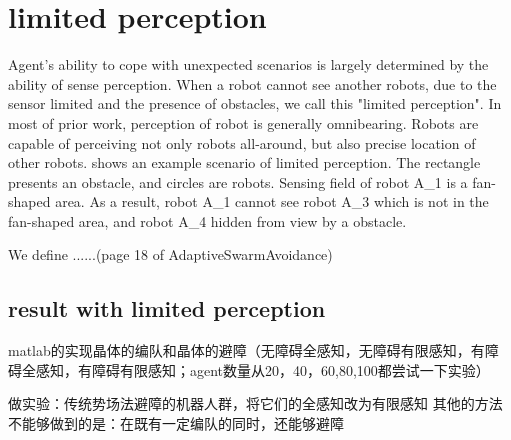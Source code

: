 \section{limited perception}

Agent's ability to cope with unexpected scenarios is largely determined by the ability of sense perception\cite{Distributed adaptive swarm for obstacle avoidance}. 
When a robot cannot see another robots, due to the sensor limited and the presence of obstacles, we call this "limited perception".
In most of prior work, perception of robot is generally omnibearing. 
Robots are capable of perceiving not only robots all-around, but also precise location of other robots\cite{}.
\figurename{} shows an example scenario of  limited perception. The rectangle presents an obstacle, and circles are robots. 
Sensing field of robot A_1 is a fan-shaped area. As a result, robot A_1 cannot see robot A_3 which is not in the fan-shaped area, and robot A_4 hidden from view by a obstacle.

We define ......(page 18 of AdaptiveSwarmAvoidance)

\subsection{result with limited perception}
matlab的实现晶体的编队和晶体的避障（无障碍全感知，无障碍有限感知，有障碍全感知，有障碍有限感知；agent数量从20，40，60,80,100都尝试一下实验）

做实验：传统势场法避障的机器人群，将它们的全感知改为有限感知
其他的方法不能够做到的是：在既有一定编队的同时，还能够避障

